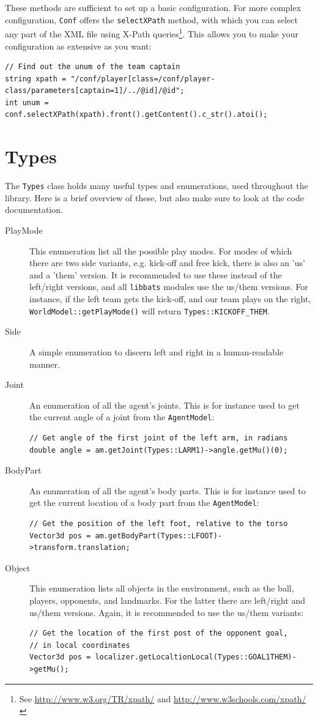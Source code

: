 These methods are sufficient to set up a basic configuration. For more complex configuration, {\tt Conf} offers the {\tt selectXPath} method, with which you can select any part of the XML file using X-Path queries\footnote{See \url{http://www.w3.org/TR/xpath/} and \url{http://www.w3schools.com/xpath/}}. This allows you to make your configuration as extensive as you want:
\begin{lstlisting}[frame=single]
// Find out the unum of the team captain
string xpath = "/conf/player[class=/conf/player-class/parameters[captain=1]/../@id]/@id";
int unum = conf.selectXPath(xpath).front().getContent().c_str().atoi();
\end{lstlisting}

\section{Types}

The {\tt Types} class holds many useful types and enumerations, used throughout the library. Here is a brief overview of these, but also make sure to look at the code documentation.
\begin{description}
\item[PlayMode] This enumeration list all the possible play modes. For modes of which there are two side variants, e.g. kick-off and free kick, there is also an 'us' and a 'them' version. It is recommended to use these instead of the left/right versions, and all {\tt libbats} modules use the us/them versions. For instance, if the left team gets the kick-off, and our team plays on the right, {\tt WorldModel::getPlayMode()} will return {\tt Types::KICKOFF\_THEM}.
\item[Side] A simple enumeration to discern left and right in a human-readable manner.
\item[Joint] An enumeration of all the agent's joints. This is for instance used to get the current angle of a joint from the {\tt AgentModel}:
\begin{lstlisting}[frame=single]
// Get angle of the first joint of the left arm, in radians
double angle = am.getJoint(Types::LARM1)->angle.getMu()(0);
\end{lstlisting}
\item[BodyPart] An enumeration of all the agent's body parts. This is for instance used to get the current location of a body part from the {\tt AgentModel}:
\begin{lstlisting}[frame=single]
// Get the position of the left foot, relative to the torso
Vector3d pos = am.getBodyPart(Types::LFOOT)->transform.translation;
\end{lstlisting}
\item[Object] This enumeration lists all objects in the environment, such as the ball, players, opponents, and landmarks. For the latter there are left/right and us/them versions. Again, it is recommended to use the us/them variants:
\begin{lstlisting}[frame=single]
// Get the location of the first post of the opponent goal,
// in local coordinates
Vector3d pos = localizer.getLocaltionLocal(Types::GOAL1THEM)->getMu();
\end{lstlisting}
\end{description}

